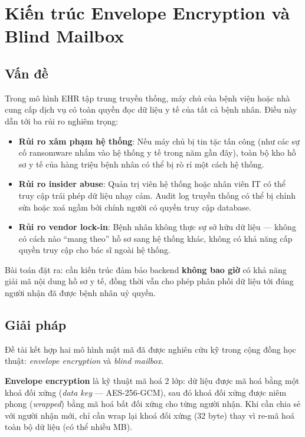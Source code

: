 \documentclass[../DoAn]{subfiles}
\begin{document}

\section{Kiến trúc Envelope Encryption và Blind Mailbox}

\subsection{Vấn đề}

Trong mô hình EHR tập trung truyền thống, máy chủ của bệnh viện hoặc nhà cung cấp dịch vụ có toàn quyền đọc dữ liệu y tế của tất cả bệnh nhân. Điều này dẫn tới ba rủi ro nghiêm trọng:

\begin{itemize}
    \item \textbf{Rủi ro xâm phạm hệ thống}: Nếu máy chủ bị tin tặc tấn công (như các sự cố ransomware nhắm vào hệ thống y tế trong năm gần đây), toàn bộ kho hồ sơ y tế của hàng triệu bệnh nhân có thể bị rò rỉ một cách hệ thống.
    \item \textbf{Rủi ro insider abuse}: Quản trị viên hệ thống hoặc nhân viên IT có thể truy cập trái phép dữ liệu nhạy cảm. Audit log truyền thống có thể bị chỉnh sửa hoặc xoá ngầm bởi chính người có quyền truy cập database.
    \item \textbf{Rủi ro vendor lock-in}: Bệnh nhân không thực sự sở hữu dữ liệu --- không có cách nào ``mang theo'' hồ sơ sang hệ thống khác, không có khả năng cấp quyền truy cập cho bác sĩ ngoài hệ thống.
\end{itemize}

Bài toán đặt ra: cần kiến trúc đảm bảo backend \textbf{không bao giờ} có khả năng giải mã nội dung hồ sơ y tế, đồng thời vẫn cho phép phân phối dữ liệu tới đúng người nhận đã được bệnh nhân uỷ quyền.

\subsection{Giải pháp}

Đề tài kết hợp hai mô hình mật mã đã được nghiên cứu kỹ trong cộng đồng học thuật: \textit{envelope encryption} và \textit{blind mailbox}.

\textbf{Envelope encryption} là kỹ thuật mã hoá 2 lớp: dữ liệu được mã hoá bằng một khoá đối xứng (\textit{data key} --- AES-256-GCM), sau đó khoá đối xứng được niêm phong (\textit{wrapped}) bằng mã hoá bất đối xứng cho từng người nhận. Khi cần chia sẻ với người nhận mới, chỉ cần wrap lại khoá đối xứng (32 byte) thay vì re-mã hoá toàn bộ dữ liệu (có thể nhiều MB).
\end{document}

